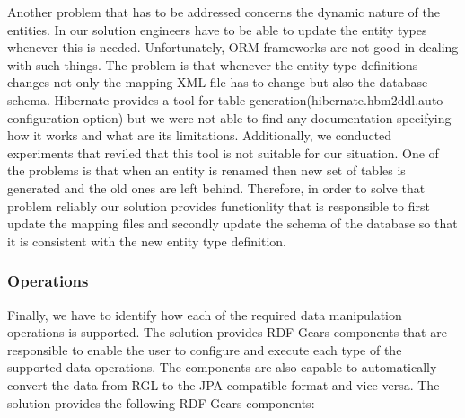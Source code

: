 Another problem that has to be addressed concerns the dynamic nature of the entities. In our solution engineers have to be able to update the entity types whenever this is needed. Unfortunately, ORM frameworks are not good in dealing with such things. The problem is that whenever the entity type definitions changes not only the mapping XML file has to change but also the database schema. Hibernate provides a tool for table generation(hibernate.hbm2ddl.auto configuration option) but we were not able to find any documentation specifying how it works and what are its limitations. Additionally, we conducted experiments that reviled that this tool is not suitable for our situation. One of the problems is that when an entity is renamed then new set of tables is generated and the old ones are left behind. Therefore, in order to solve that problem reliably our solution provides functionlity that is responsible to first update the mapping files and secondly update the schema of the database so that it is consistent with the new entity type definition.


\subsubsection{Operations}
Finally, we have to identify how each of the required data manipulation operations is supported. The solution provides RDF Gears components that are responsible to enable the user to configure and execute each type of the supported data operations. The components are also capable to automatically convert the data from RGL to the JPA compatible format and vice versa. The solution provides the following RDF Gears components:

